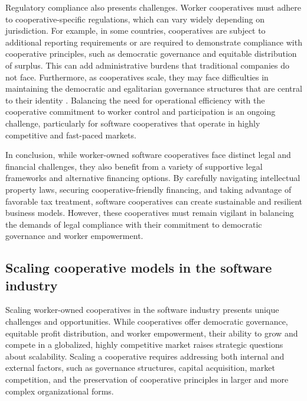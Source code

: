 \begin{refsection}
Regulatory compliance also presents challenges. Worker cooperatives must adhere to cooperative-specific regulations, which can vary widely depending on jurisdiction. For example, in some countries, cooperatives are subject to additional reporting requirements or are required to demonstrate compliance with cooperative principles, such as democratic governance and equitable distribution of surplus. This can add administrative burdens that traditional companies do not face. Furthermore, as cooperatives scale, they may face difficulties in maintaining the democratic and egalitarian governance structures that are central to their identity \cite[pp.~21-23]{birchall2010}. Balancing the need for operational efficiency with the cooperative commitment to worker control and participation is an ongoing challenge, particularly for software cooperatives that operate in highly competitive and fast-paced markets.

In conclusion, while worker-owned software cooperatives face distinct legal and financial challenges, they also benefit from a variety of supportive legal frameworks and alternative financing options. By carefully navigating intellectual property laws, securing cooperative-friendly financing, and taking advantage of favorable tax treatment, software cooperatives can create sustainable and resilient business models. However, these cooperatives must remain vigilant in balancing the demands of legal compliance with their commitment to democratic governance and worker empowerment.

\subsection{Scaling cooperative models in the software industry}

Scaling worker-owned cooperatives in the software industry presents unique challenges and opportunities. While cooperatives offer democratic governance, equitable profit distribution, and worker empowerment, their ability to grow and compete in a globalized, highly competitive market raises strategic questions about scalability. Scaling a cooperative requires addressing both internal and external factors, such as governance structures, capital acquisition, market competition, and the preservation of cooperative principles in larger and more complex organizational forms.


\end{refsection}
